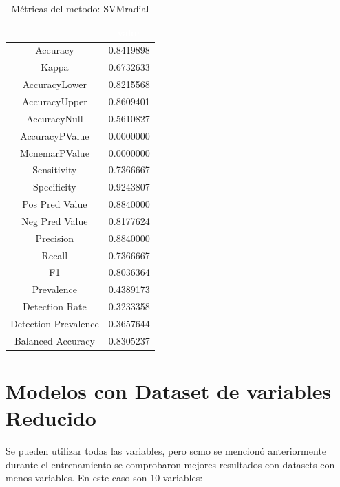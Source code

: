 \documentclass[]{article}
\begin{document}
\begin{table}[!h]

\caption{\label{tab:metricas_SVMradial}Métricas del metodo: SVMradial }
\centering
\begin{tabular}[t]{cc}
\toprule
\rowcolor{black}  \multicolumn{1}{c}{\textcolor{white}{\textbf{metricas}}} & \multicolumn{1}{c}{\textcolor{white}{\textbf{valor}}}\\
\midrule
\rowcolor{gray!6}  Accuracy & 0.8419898\\
Kappa & 0.6732633\\
\rowcolor{gray!6}  AccuracyLower & 0.8215568\\
AccuracyUpper & 0.8609401\\
\rowcolor{gray!6}  AccuracyNull & 0.5610827\\
\addlinespace
AccuracyPValue & 0.0000000\\
\rowcolor{gray!6}  McnemarPValue & 0.0000000\\
Sensitivity & 0.7366667\\
\rowcolor{gray!6}  Specificity & 0.9243807\\
Pos Pred Value & 0.8840000\\
\addlinespace
\rowcolor{gray!6}  Neg Pred Value & 0.8177624\\
Precision & 0.8840000\\
\rowcolor{gray!6}  Recall & 0.7366667\\
F1 & 0.8036364\\
\rowcolor{gray!6}  Prevalence & 0.4389173\\
\addlinespace
Detection Rate & 0.3233358\\
\rowcolor{gray!6}  Detection Prevalence & 0.3657644\\
Balanced Accuracy & 0.8305237\\
\bottomrule
\end{tabular}
\end{table}

\hypertarget{modelos-con-dataset-de-variables-reducido}{%
\section{Modelos con Dataset de variables
Reducido}\label{modelos-con-dataset-de-variables-reducido}}

Se pueden utilizar todas las variables, pero scmo se mencionó
anteriormente durante el entrenamiento se comprobaron mejores resultados
con datasets con menos variables. En este caso son 10 variables:
\end{document}
